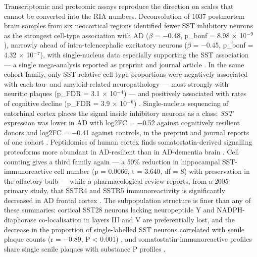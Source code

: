 \documentclass[11pt]{article}
\begin{document}
Transcriptomic and proteomic assays reproduce the direction on scales that cannot be converted into the RIA numbers. Deconvolution of 1037 postmortem brain samples from six neocortical regions identified fewer SST inhibitory neurons as the strongest cell-type association with AD ($\beta$ = $-$0.48, p\_bonf = 8.98 $\times$ 10$^{-}$$^{9}$), narrowly ahead of intra-telencephalic excitatory neurons ($\beta$ = $-$0.45, p\_bonf = 4.32 $\times$ 10$^{-}$$^{7}$), with single-nucleus data especially supporting the SST association --- a single mega-analysis reported as preprint and journal article \citep{Consens2022a,Consens2022b}. In the same cohort family, only SST relative cell-type proportions were negatively associated with each tau- and amyloid-related neuropathology --- most strongly with neuritic plaques (p\_FDR = 3.1 $\times$ 10$^{-}$$^{4}$) --- and positively associated with rates of cognitive decline (p\_FDR = 3.9 $\times$ 10$^{-}$$^{6}$) \citep{Consens2022b}. Single-nucleus sequencing of entorhinal cortex places the signal inside inhibitory neurons as a class: \emph{SST} expression was lower in AD with log2FC = $-$0.52 against cognitively resilient donors and log2FC = $-$0.41 against controls, in the preprint and journal reports of one cohort \citep{Castanho2025b,Castanho2025a}. Peptidomics of human cortex finds somatostatin-derived signalling proteoforms more abundant in AD-resilient than in AD-dementia brain \citep{Morgan2024b}. Cell counting gives a third family again --- a 50\% reduction in hippocampal SST-immunoreactive cell number (p = 0.0066, t = 3.640, df = 8) with preservation in the olfactory bulb \citep{GonzalezRodriguez2021} --- while a pharmacological review reports, from a 2005 primary study, that SSTR4 and SSTR5 immunoreactivity is significantly decreased in AD frontal cortex \citep{Sandoval2024}. The subpopulation structure is finer than any of these summaries: cortical SST28 neurons lacking neuropeptide Y and NADPH-diaphorase co-localisation in layers III and V are preferentially lost, and the decrease in the proportion of single-labelled SST neurons correlated with senile plaque counts (r = $-$0.89, P < 0.001) \citep{Gaspar1989}, and somatostatin-immunoreactive profiles share single senile plaques with substance P profiles \citep{Armstrong1989}.
\end{document}
